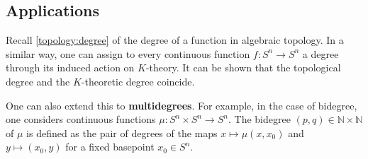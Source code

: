 \subsection{Applications}


    \begin{property}[Degree]
        Recall \cref{topology:degree} of the degree of a function in algebraic topology. In a similar way, one can assign to every continuous function $f:S^n\rightarrow S^n$ a degree through its induced action on $K$-theory. It can be shown that the topological degree and the $K$-theoretic degree coincide.

        One can also extend this to \textbf{multidegrees}. For example, in the case of bidegree, one considers continuous functions $\mu:S^n\times S^n\rightarrow S^n$. The bidegree $(p,q)\in\mathbb{N}\times\mathbb{N}$ of $\mu$ is defined as the pair of degrees of the maps $x\mapsto\mu(x,x_0)$ and $y\mapsto(x_0,y)$ for a fixed basepoint $x_0\in S^n$.
    \end{property}


